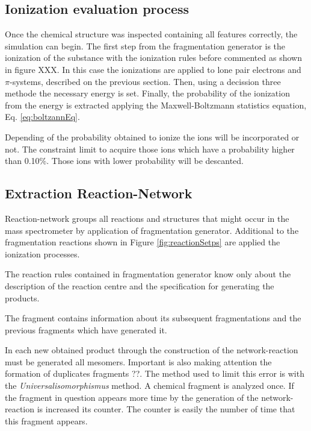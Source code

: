 \documentclass[10pt]{bmc_article}
\newenvironment{bmcformat}{\begin{raggedright}\baselineskip20pt\sloppy\setboolean{publ}{false}}{\end{raggedright}\baselineskip20pt\sloppy}
\begin{document}
\begin{bmcformat}
\subsection{Ionization evaluation process \label{learningIP}}

Once the chemical structure was inspected containing all features correctly, 
the simulation can begin. The first step from the fragmentation generator is 
the ionization of the substance with the ionization rules before commented
as shown in figure XXX. In this case the ionizations are applied to lone pair electrons and 
$\pi$-systems, described on the previous section. Then, using a decission three 
methode the necessary energy is set. Finally, the probability of the ionization 
from the energy is extracted applying the Maxwell-Boltzmann statistics 
equation, Eq. \ref{eq:boltzannEq}.

Depending of the probability obtained to ionize the ions will be incorporated 
or not. The constraint limit to acquire those ions which have a probability 
higher than 0.10\%. Those ions with lower probability will be descanted.



\subsection{Extraction Reaction-Network}

Reaction-network groups all reactions and structures that might occur in the 
mass spectrometer by application of fragmentation generator. Additional to the 
fragmentation reactions shown in Figure \ref{fig:reactionSetps} are applied the 
ionization processes.

The reaction rules contained in fragmentation generator know only about the 
description of the reaction centre and the specification for generating the 
products.


The fragment contains information about its subsequent fragmentations and the 
previous fragments which have generated it.

In each new obtained product through the construction of the network-reaction 
must be generated all mesomers. Important is also making 
attention the formation of duplicates fragments ??. The method used to limit 
this error is with the \emph{Universalisomorphismus} method. A chemical 
fragment is analyzed once. If the fragment in question appears more time by the 
generation of the network-reaction is increased its counter. The counter is 
easily the number of time that this fragment appears.



\end{bmcformat}
\end{document}
